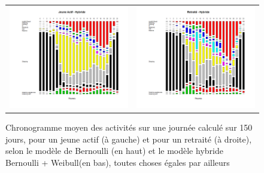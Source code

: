 \begin{figure}[H]
\begin{tabular}{cc}
\includegraphics[scale=0.38]{Images/Activites/JeuneActifHybride} &
\includegraphics[scale=0.38]{Images/Activites/RetraiteHybride} \\
\end{tabular}
\caption{Chronogramme moyen des activités sur une journée calculé sur 150 jours, pour un jeune actif (à gauche) et pour un retraité (à droite), selon le modèle de Bernoulli (en haut) et le modèle hybride Bernoulli + Weibull(en bas), toutes choses égales par ailleurs}
\label{fig:Activités}
\end{figure}

